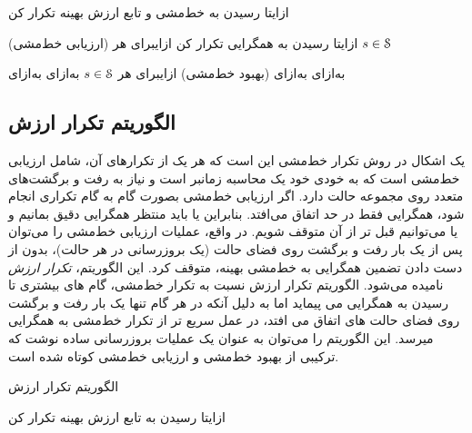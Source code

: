 ‌ازای{تا رسیدن به خط‌مشی و تابع ارزش بهینه تکرار کن}

(ارزیابی خط‌مشی)
‌ازای{تا رسیدن به همگرایی تکرار کن}
‌ازای{برای هر $s \in \EuScript{S}$}

‌به‌ازای
‌به‌ازای
(بهبود خط‌مشی)
‌ازای{برای هر $s \in \EuScript{S}$}
‌به‌ازای
‌به‌ازای


\subsection{الگوریتم تکرار ارزش}
یک اشکال در روش تکرار خط‌مشی این است که هر یک از تکرارهای آن، شامل ارزیابی خط‌مشی است که
به خودی خود یک محاسبه زمان\nf بر است و نیاز به رفت و برگشت‌های متعدد روی مجموعه حالت دارد. اگر
ارزیابی خط‌مشی بصورت گام به گام تکراری انجام شود، همگرایی فقط در حد اتفاق می‌افتد. بنابراین یا باید منتظر همگرایی دقیق بمانیم و یا می‌توانیم قبل تر از آن متوقف شویم. 
در واقع، عملیات ارزیابی خط‌مشی را می‌توان پس از یک بار رفت و برگشت روی فضای حالت (یک بروزرسانی در هر حالت)،  بدون از دست دادن تضمین همگرایی به خط‌مشی بهینه، متوقف کرد. 
این الگوریتم،
\textit{تکرار ارزش}
 نامیده می‌شود. الگوریتم تکرار ارزش نسبت به تکرار خط‌مشی، گام های بیشتری تا رسیدن به همگرایی می پیماید اما به دلیل آنکه در هر گام تنها یک بار رفت و برگشت روی فضای حالت های اتفاق می افتد، در عمل سریع تر از تکرار خط‌مشی به همگرایی می\nf رسد. این الگوریتم
را می‌توان به عنوان یک عملیات بروزرسانی ساده نوشت که ترکیبی از بهبود خط‌مشی و ارزیابی خط‌مشی کوتاه شده است.



{الگوریتم تکرار ارزش}

‌ازای{تا رسیدن به تابع ارزش بهینه تکرار کن}

